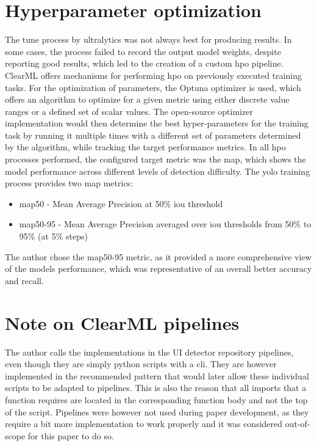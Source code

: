 \documentclass[Bachelor, BIC, english, fhCitStyle, IEEE]{BASE/twbook} %
\begin{document}
\section{Hyperparameter optimization}
The tune process by ultralytics was not always best for producing results. In some cases, the process failed to record the output model weights, despite reporting good results, which led to the creation of a custom \ac{hpo} pipeline.\\
ClearML offers mechanisms for performing \ac{hpo} \autocite{HyperparameterOptimizationClearML} on previously executed training tasks. For the optimization of parameters, the Optuna optimizer \autocite{OptunaHyperparameterOptimization} is used, which offers an algorithm to optimize for a given metric using either discrete value ranges or a defined set of scalar values. The open-source optimizer implementation would then determine the best hyper-parameters for the training task by running it multiple times with a different set of parameters determined by the algorithm, while tracking the target performance metrics. In all \ac{hpo} processes performed, the configured target metric was the \ac{map}, which shows the model performance across different levels of detection difficulty. The \ac{yolo} training process provides two \ac{map} metrics:
\begin{itemize}
    \item \ac{map}50 - Mean Average Precision at 50\% \ac{iou} threshold
    \item \ac{map}50-95 - Mean Average Precision averaged over \ac{iou} thresholds from 50\% to 95\% (at 5\% steps)
\end{itemize}
The author chose the \ac{map}50-95 metric, as it provided a more comprehensive view of the models performance, which was representative of an overall better accuracy and recall.
\section{Note on ClearML pipelines}
The author calls the implementations in the UI detector repository pipelines, even though they are simply python scripts with a \ac{cli}. They are however implemented in the recommended pattern \autocite{PipelineDecoratorClearML} that would later allow these individual scripts to be adapted to pipelines. This is also the reason that all imports that a function requires are located in the corresponding function body and not the top of the script. Pipelines were however not used during paper development, as they require a bit more implementation to work properly and it was considered out-of-scope for this paper to do so.
\clearpage
\end{document}
